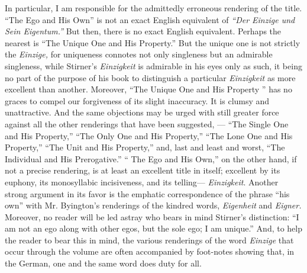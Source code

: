 In particular, I am responsible for the admittedly erroneous rendering of the 
title. ``The Ego and His Own'' is not an exact English equivalent of 
\textit{``Der Einzige und Sein Eigentum.''} But then, there is no exact 
English equivalent. Perhaps the nearest is ``The Unique One and His 
Property.'' But the unique one is not strictly the \textit{Einzige,} for 
uniqueness connotes not only singleness but an admirable singleness, while 
Stirner's \textit{Einzigkeit} is admirable in his eyes only as such, it being 
no part of the purpose of his book to distinguish a particular 
\textit{Einzigkeit} as more excellent than another. Moreover, ``The Unique 
One and His Property '' has no graces to compel our forgiveness of its slight 
inaccuracy. It is clumsy and unattractive. And the same objections may be 
urged with still greater force against all the other renderings that have been 
suggested, --- ``The Single One and His Property,'' ``The Only One and His 
Property,'' ``The Lone One and His Property,'' ``The Unit and His 
Property,'' and, last and least and worst, ``The Individual and His 
Prerogative.'' `` The Ego and His Own,'' on the other hand, if not a 
precise rendering, is at least an excellent title in itself; excellent by its 
euphony, its monosyllabic incisiveness, and its telling--- 
\textit{Einzigkeit}. Another strong argument in its favor is the emphatic 
correspondence of the phrase ``his own'' with Mr. Byington's renderings of 
the kindred words, \textit{Eigenheit} and \textit{Eigner.} Moreover, no reader 
will be led astray who bears in mind Stirner's distinction: ``I am not an ego 
along with other egos, but the sole ego; I am unique.'' And, to help the 
reader to bear this in mind, the various renderings of the word 
\textit{Einzige} that occur through the volume are often accompanied by 
foot-notes showing that, in the German, one and the same word does duty for 
all.

